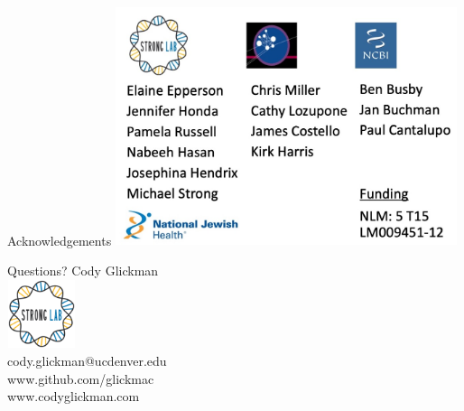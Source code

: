 \documentclass[11pt, xcolor=table]{beamer}
\begin{document}
	
	
	\begin{frame}{Acknowledgements}
	\center
	\includegraphics[height=7cm, width=10cm]{CPBS_11_18/Acknowledgements.jpg}
	\end{frame}
	
	\begin{frame}{Questions?}
	\center
	Cody Glickman \\ \includegraphics[height=2cm, width=2cm]{lablogo.png} \\ cody.glickman@ucdenver.edu \\ \alert{www.github.com/glickmac} \\ www.codyglickman.com
	\end{frame}

	
	
\end{document}
